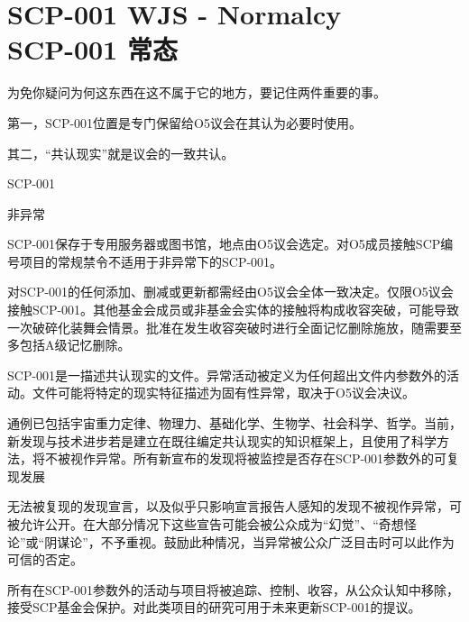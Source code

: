 \chapter[SCP-001 常态]{
    SCP-001 WJS - Normalcy\\
    SCP-001 常态
}

\label{chap:SCP-001.normalcy}

\begin{whiteboxbb}

\begin{center}


\end{center}

为免你疑问为何这东西在这不属于它的地方，要记住两件重要的事。

第一，SCP-001位置是专门保留给O5议会在其认为必要时使用。

其二，“共认现实”就是议会的一致共认。

\end{whiteboxbb}

SCP-001

非异常

SCP-001保存于专用服务器或图书馆，地点由O5议会选定。对O5成员接触SCP编号项目的常规禁令不适用于非异常下的SCP-001。

对SCP-001的任何添加、删减或更新都需经由O5议会全体一致决定。仅限O5议会接触SCP-001。其他基金会成员或非基金会实体的接触将构成收容突破，可能导致一次破碎化装舞会情景。批准在发生收容突破时进行全面记忆删除施放，随需要至多包括A级记忆删除。

SCP-001是一描述共认现实的文件。异常活动被定义为任何超出文件内参数外的活动。文件可能将特定的现实特征描述为固有性异常，取决于O5议会决议。

通例已包括宇宙重力定律、物理力、基础化学、生物学、社会科学、哲学。当前，新发现与技术进步若是建立在既往编定共认现实的知识框架上，且使用了科学方法，将不被视作异常。所有新宣布的发现将被监控是否存在SCP-001参数外的可复现发展

无法被复现的发现宣言，以及似乎只影响宣言报告人感知的发现不被视作异常，可被允许公开。在大部分情况下这些宣告可能会被公众成为“幻觉”、“奇想怪论”或“阴谋论”，不予重视。鼓励此种情况，当异常被公众广泛目击时可以此作为可信的否定。

所有在SCP-001参数外的活动与项目将被追踪、控制、收容，从公众认知中移除，接受SCP基金会保护。对此类项目的研究可用于未来更新SCP-001的提议。

\begin{center}


\end{center}

